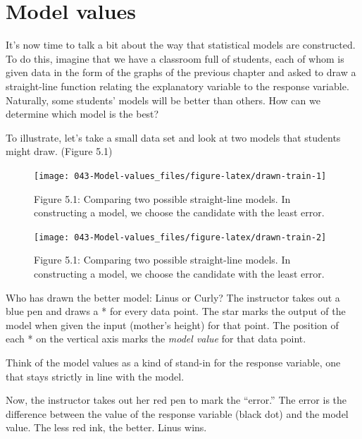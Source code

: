 \documentclass[]{tufte-book}
\begin{document}
\hypertarget{model-values}{%
\chapter{Model values}\label{model-values}}

It's now time to talk a bit about the way that statistical models are constructed. To do this, imagine that we have a classroom full of students, each of whom is given data in the form of the graphs of the previous chapter and asked to draw a straight-line function relating the explanatory variable to the response variable. Naturally, some students' models will be better than others. How can we determine which model is the best?

To illustrate, let's take a small data set and look at two models that students might draw. (Figure 5.1)



\begin{figure}\texttt{[image: 043-Model-values\_files/figure-latex/drawn-train-1]} \caption[Figure 5.1: Comparing two possible straight-line models. In constructing a model, we choose the candidate with the least error.]{Figure 5.1: Comparing two possible straight-line models. In constructing a model, we choose the candidate with the least error.}\label{fig:drawn-train}
\end{figure}
\begin{figure}\texttt{[image: 043-Model-values\_files/figure-latex/drawn-train-2]} \caption[Figure 5.1: Comparing two possible straight-line models. In constructing a model, we choose the candidate with the least error.]{Figure 5.1: Comparing two possible straight-line models. In constructing a model, we choose the candidate with the least error.}\label{fig:drawn-train}
\end{figure}

Who has drawn the better model: Linus or Curly? The instructor takes out a blue pen and draws a * for every data point. The star marks the output of the model when given the input (mother's height) for that point. The position of each * on the vertical axis marks the \emph{model value} for that data point.

Think of the model values as a kind of stand-in for the response variable, one that stays strictly in line with the model.

Now, the instructor takes out her red pen to mark the ``error.'' The error is the difference between the value of the response variable (black dot) and the model value. The less red ink, the better. Linus wins.
\end{document}
